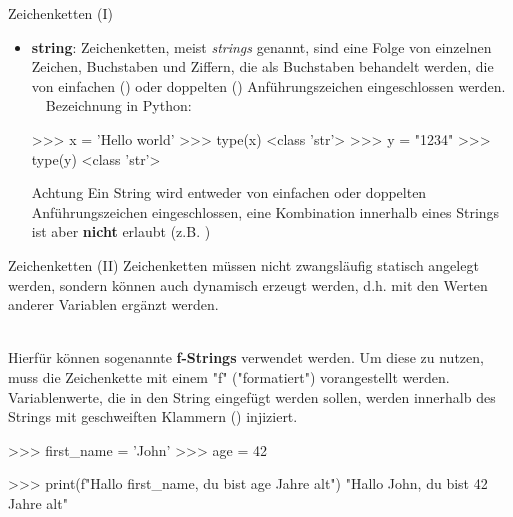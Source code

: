         \begin{frame}[fragile]{Zeichenketten (I)}
        
            \begin{itemize}
                \item \textbf{string}: Zeichenketten, meist \textit{strings} genannt, sind eine Folge von einzelnen Zeichen, Buchstaben und Ziffern, die als Buchstaben behandelt werden, die von einfachen () oder doppelten () Anführungszeichen eingeschlossen werden.\\~\
                Bezeichnung in Python: \textbf{}
\begin{pyconcode}
>>> x = 'Hello world'
>>> type(x)
<class 'str'>
>>> y = "1234"
>>> type(y)
<class 'str'>
\end{pyconcode}

            \begin{alertblock}{Achtung}
                Ein String wird entweder von einfachen oder doppelten Anführungszeichen eingeschlossen, eine Kombination innerhalb eines Strings ist aber \textbf{nicht} erlaubt (z.B. )
            \end{alertblock}
            
            \end{itemize}
            
        \end{frame}
        
        \begin{frame}[fragile]{Zeichenketten (II)}
            Zeichenketten müssen nicht zwangsläufig statisch angelegt werden, sondern können auch dynamisch erzeugt werden, d.h. mit den Werten anderer Variablen ergänzt werden.\\~\
            
            
            Hierfür können sogenannte \textbf{f-Strings} verwendet werden. Um diese zu nutzen, muss die Zeichenkette mit einem "f" ("formatiert") vorangestellt werden. Variablenwerte, die in den String eingefügt werden sollen, werden innerhalb des Strings mit geschweiften Klammern (\code{\{\}}) injiziert.
\begin{pythoncode}
>>> first_name = 'John'
>>> age = 42

>>> print(f"Hallo {first_name}, du bist {age} Jahre alt")
"Hallo John, du bist 42 Jahre alt"
        
\end{pythoncode}
        
        \end{frame}
        
